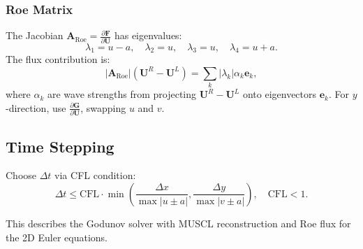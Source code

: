 \documentclass[a4paper,12pt]{article}
\begin{document}
\subsubsection*{Roe Matrix}
The Jacobian \(\mathbf{A}_{\text{Roe}} = \frac{\partial \mathbf{F}}{\partial \mathbf{U}}\) has eigenvalues:
\[
\lambda_1 = u - a, \quad \lambda_2 = u, \quad \lambda_3 = u, \quad \lambda_4 = u + a.
\]
The flux contribution is:
\[
\left| \mathbf{A}_{\text{Roe}} \right| (\mathbf{U}^R - \mathbf{U}^L) = \sum_k |\lambda_k| \alpha_k \mathbf{e}_k,
\]
where \(\alpha_k\) are wave strengths from projecting \(\mathbf{U}^R - \mathbf{U}^L\) onto eigenvectors \(\mathbf{e}_k\). For \(y\)-direction, use \(\frac{\partial \mathbf{G}}{\partial \mathbf{U}}\), swapping \(u\) and \(v\).

\subsection*{Time Stepping}
Choose \(\Delta t\) via CFL condition:
\[
\Delta t \leq \text{CFL} \cdot \min \left( \frac{\Delta x}{\max |u \pm a|}, \frac{\Delta y}{\max |v \pm a|} \right), \quad \text{CFL} < 1.
\]

This describes the Godunov solver with MUSCL reconstruction and Roe flux for the 2D Euler equations.
\end{document}
